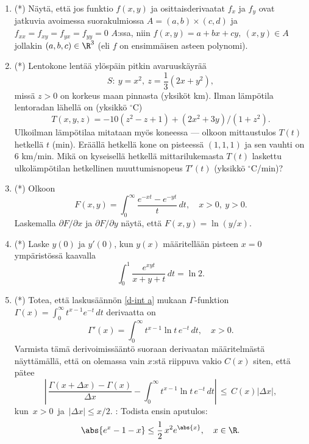 \begin{enumerate}
\item (*) 
Näytä, että jos funktio $f(x,y)$ ja osittaisderivaatat $f_x$ ja $f_y$ ovat jatkuvia avoimessa
suorakulmiossa $A=(a,b)\times(c,d)$ ja $f_{xx}=f_{xy}=f_{yx}=f_{yy}=0$ $A$:ssa, niin
$f(x,y)=a+bx+cy,\ (x,y) \in A$ jollakin $(a,b,c)\in\R^3$ (eli $f$ on ensimmäisen asteen
polynomi).

\item (*)
Lentokone lentää ylöspäin pitkin avaruuskäyrää 
\[
S:\ y=x^2,\ z=\frac{1}{3}(2x+y^2),
\]
missä $z>0$ on korkeus maan pinnasta (yksiköt km). Ilman lämpötila lentoradan lähellä on
(yksikkö $^\circ$C)
\[
T(x,y,z)=-10(z^2-z+1)+(2x^2+3y)/(1+z^2).
\]
Ulkoilman lämpötilaa mitataan myös koneessa --- olkoon mittaustulos $T(t)$ hetkellä $t$ (min).
Eräällä hetkellä kone on pisteessä $(1,1,1)$ ja sen vauhti on $6$ km/min. Mikä on kyseisellä
hetkellä mittarilukemasta $T(t)$ laskettu ulkolämpötilan hetkellinen muuttumisnopeus $T'(t)$
(yksikkö $^\circ$C/min)?

\item (*)
Olkoon
\[
F(x,y)=\int_0^\infty \frac{e^{-xt}-e^{-yt}}{t}\,dt, \quad x>0,\ y>0.
\]
Laskemalla $\partial F/\partial x$ ja $\partial F/\partial y$ näytä, että $F(x,y)=\ln(y/x)$.

\item (*)
Laske $y(0)$ ja $y'(0)$, kun $y(x)$ määritellään pisteen $x=0$ ympäristössä kaavalla
\[
\int_0^1 \frac{e^{xyt}}{x+y+t}\,dt = \ln 2.
\]

\item (*) \label{H-udif-1: Gamman derivaatta}
Totea, että laskusäännön \eqref{d-int a} mukaan $\Gamma$-funktion
$\Gamma(x) =\int_0^\infty t^{x-1}e^{-t}\,dt$ derivaatta on
\[
\Gamma'(x)=\int_0^\infty t^{x-1}\ln t\,e^{-t}\,dt, \quad x>0.
\]
Varmista tämä derivoimissääntö suoraan derivaatan määritelmästä näyttämällä, että on olemassa
vain $x$:stä riippuva vakio $C(x)$ siten, että pätee
\[
\left|\,\frac{\Gamma(x+\Delta x)-\Gamma(x)}{\Delta x}
    -\int_0^\infty t^{x-1}\ln t\,e^{-t}\,dt\right|\,\le\,C(x)|\Delta x|,
\]           
kun $\,x>0\,$ ja $\,|\Delta x| \le x/2$. : Todista ensin aputulos:
\[
\abs{e^x-1-x} \le \frac{1}{2}\,x^2 e^{\abs{x}}, \quad x\in\R.
\]

\end{enumerate}